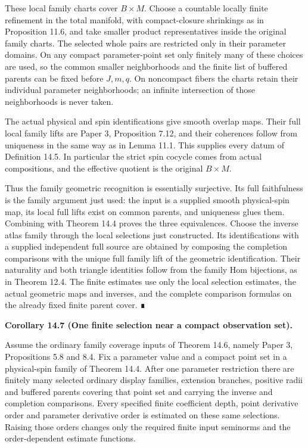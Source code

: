\documentclass[
  english,
  11pt,
  reqno]{amsart}
\makeatletter
\newcommand{\pandocstatementheading}[1]{%
  \par\if@nobreak\else
    \addpenalty{\@beginparpenalty}%
    \addvspace{.5\baselineskip plus .2\baselineskip minus .2\baselineskip}%
  \fi
  {\normalfont\bfseries #1\par}%
  \nobreak\@afterindenttrue\@afterheading
}
\makeatother
\begin{document}
These local family charts cover \(B\times M\). Choose a countable
locally finite refinement in the total manifold, with compact-closure
shrinkings as in Proposition 11.6, and take smaller product
representatives inside the original family charts. The selected whole
pairs are restricted only in their parameter domains. On any compact
parameter-point set only finitely many of these choices are used, so the
common smaller neighborhoods and the finite list of buffered parents can
be fixed before \(J,m,q\). On noncompact fibers the charts retain their
individual parameter neighborhoods; an infinite intersection of those
neighborhoods is never taken.

The actual physical and spin identifications give smooth overlap maps.
Their full local family lifts are Paper 3, Proposition 7.12, and their
coherences follow from uniqueness in the same way as in Lemma 11.1. This
supplies every datum of Definition 14.5. In particular the strict spin
cocycle comes from actual compositions, and the effective quotient is
the original \(B\times M\).

Thus the family geometric recognition is essentially surjective. Its
full faithfulness is the family argument just used: the input is a
supplied smooth physical-spin map, its local full lifts exist on common
parents, and uniqueness glues them. Combining with Theorem 14.4 proves
the three equivalences. Choose the inverse atlas family through the
local selections just constructed. Its identifications with a supplied
independent full source are obtained by composing the completion
comparisons with the unique full family lift of the geometric
identification. Their naturality and both triangle identities follow
from the family Hom bijections, as in Theorem 12.4. The finite estimates
use only the local selection estimates, the actual geometric maps and
inverses, and the complete comparison formulas on the already fixed
finite parent cover. ∎

\pandocstatementheading{\protect{}\label{cor:family-controlled-compact-selections}Corollary 14.7 (One finite selection near a compact observation set).}

Assume the ordinary family coverage inputs of Theorem 14.6, namely Paper
3, Propositions 5.8 and 8.4. Fix a parameter value and a compact point
set in a physical-spin family of Theorem 14.4. After one parameter
restriction there are finitely many selected ordinary display families,
extension branches, positive radii and buffered parents covering that
point set and carrying the inverse and completion comparisons. Every
specified finite coefficient depth, point derivative order and parameter
derivative order is estimated on these same selections. Raising those
orders changes only the required finite input seminorms and the
order-dependent estimate functions.
\end{document}

